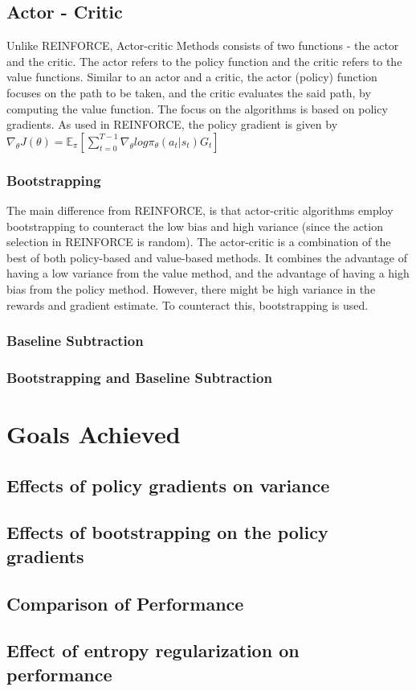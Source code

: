 \documentclass{article}
\begin{document}
\subsection{Actor - Critic}
Unlike REINFORCE, Actor-critic Methods consists of two functions - the actor and the critic. The actor refers to the policy function and the critic refers to the value functions. Similar to an actor and a critic, the actor (policy) function focuses on the path to be taken, and the critic evaluates the said path, by computing the value function. 
The focus on the algorithms is based on policy gradients. \cite{actor-critic}
\newline As used in REINFORCE, the policy gradient is given by 
\newline 
$\nabla_\theta J(\theta) = \mathbb{E}_\pi[\sum _{t=0}^{T-1} \nabla_\theta log\pi_\theta (a_t|s_t)G_t]$
\subsubsection{Bootstrapping}
The main difference from REINFORCE, is that actor-critic algorithms employ bootstrapping to counteract the low bias and high variance (since the action selection in REINFORCE is random). The actor-critic is a combination of the best of both policy-based and value-based methods. It combines the advantage of having a low variance from the value method, and the advantage of having a high bias from the policy method.
However, there might be high variance in the rewards and gradient estimate. To counteract this, bootstrapping is used. 

\subsubsection{Baseline Subtraction}
\subsubsection{Bootstrapping and Baseline Subtraction}

\section{Goals Achieved}
\subsection{Effects of policy gradients on variance}
\subsection{Effects of bootstrapping on the policy gradients}
\subsection{Comparison of Performance}
\subsection{Effect of entropy regularization on performance}



\end{document}
